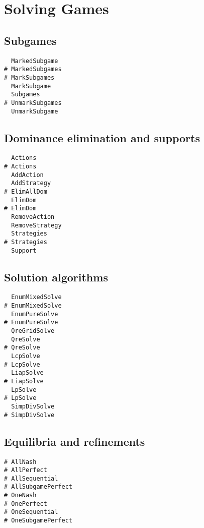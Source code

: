 \section{Solving Games}

\subsection{Subgames}

\begin{multicols}{3}
\begin{verbatim}
  MarkedSubgame 
# MarkedSubgames 
# MarkSubgames 
  MarkSubgame 
  Subgames 
# UnmarkSubgames 
  UnmarkSubgame 
\end{verbatim}
\end{multicols}

\subsection{Dominance elimination and supports}

\begin{multicols}{3}
\begin{verbatim}
  Actions
# Actions
  AddAction
  AddStrategy
# ElimAllDom 
  ElimDom 
# ElimDom 
  RemoveAction
  RemoveStrategy
  Strategies 
# Strategies 
  Support 
\end{verbatim}
\end{multicols}

\subsection{Solution algorithms}

\begin{multicols}{3}
\begin{verbatim}
  EnumMixedSolve 
# EnumMixedSolve 
  EnumPureSolve 
# EnumPureSolve 
  QreGridSolve 
  QreSolve 
# QreSolve 
  LcpSolve 
# LcpSolve 
  LiapSolve 
# LiapSolve 
  LpSolve 
# LpSolve 
  SimpDivSolve 
# SimpDivSolve 
\end{verbatim}
\end{multicols}

\subsection{Equilibria and refinements}

\begin{multicols}{3}
\begin{verbatim}
# AllNash
# AllPerfect
# AllSequential 
# AllSubgamePerfect
# OneNash
# OnePerfect
# OneSequential
# OneSubgamePerfect
\end{verbatim}
\end{multicols}

